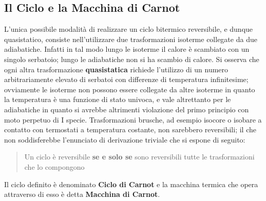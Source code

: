 \documentclass[10pt, oneside]{book}
\begin{document}
\subsection{Il Ciclo e la Macchina di Carnot}
L'unica possibile modalità di realizzare un ciclo bitermico reversibile, e dunque quasistatico, consiste nell'utilizzare due trasformazioni isoterme collegate da due adiabatiche. Infatti in tal modo lungo le isoterme il calore è scambiato con un singolo serbatoio; lungo le adiabatiche non si ha scambio di calore. Si osserva che ogni altra trasformazione \textbf{quasistatica} richiede l'utilizzo di un numero arbitrariamente elevato di serbatoi con differenze di temperatura infinitesime; ovviamente le isoterme non possono essere collegate da altre isoterme in quanto la temperatura è una funzione di stato univoca, e vale altrettanto per le adiabatiche in quanto si avrebbe altrimenti violazione del primo principio con moto perpetuo di I specie. Trasformazioni brusche, ad esempio isocore o isobare a contatto con termostati a temperatura costante, non sarebbero reversibili; il che non soddisferebbe l'enunciato di derivazione triviale che si espone di seguito:
\begin{quote}
Un ciclo è reversibile \textbf{se e solo se} sono reversibili tutte le trasformazioni che lo compongono
\end{quote}
Il ciclo definito è denominato \textbf{Ciclo di Carnot} e la macchina termica che opera attraverso di esso è detta \textbf{Macchina di Carnot}. 
\end{document}

